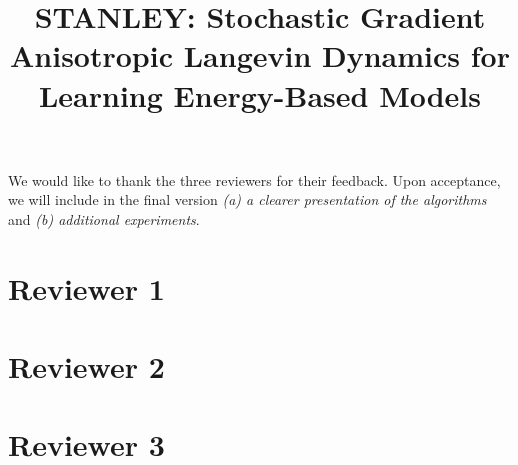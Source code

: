 \documentclass[10pt,twocolumn,letterpaper]{article}
\begin{document}
\title{STANLEY: Stochastic Gradient Anisotropic Langevin Dynamics for Learning Energy-Based Models}  %

\maketitle
\thispagestyle{empty}



We would like to thank the three reviewers for their feedback. 
Upon acceptance, we will include in the final version \emph{{\sf (a)} a clearer presentation of the algorithms} and \emph{{\sf (b)} additional experiments}. 

\section{Reviewer 1}



\section{Reviewer 2}



\section{Reviewer 3}



{\small


}
\end{document}
